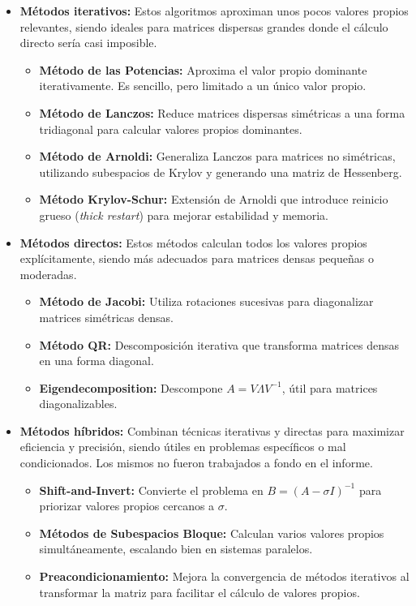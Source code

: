 \documentclass{article}
\begin{document}
\begin{itemize}
    \item \textbf{Métodos iterativos:}
    Estos algoritmos aproximan unos pocos valores propios relevantes, siendo ideales para matrices dispersas grandes donde el cálculo directo sería casi imposible.
    \begin{itemize}
        \item \textbf{Método de las Potencias:} Aproxima el valor propio dominante iterativamente. Es sencillo, pero limitado a un único valor propio.
        \item \textbf{Método de Lanczos:} Reduce matrices dispersas simétricas a una forma tridiagonal para calcular valores propios dominantes.
        \item \textbf{Método de Arnoldi:} Generaliza Lanczos para matrices no simétricas, utilizando subespacios de Krylov y generando una matriz de Hessenberg.
        \item \textbf{Método Krylov-Schur:} Extensión de Arnoldi que introduce reinicio grueso (\textit{thick restart}) para mejorar estabilidad y memoria.
    \end{itemize}

    \item \textbf{Métodos directos:}
    Estos métodos calculan todos los valores propios explícitamente, siendo más adecuados para matrices densas pequeñas o moderadas.
    \begin{itemize}
        \item \textbf{Método de Jacobi:} Utiliza rotaciones sucesivas para diagonalizar matrices simétricas densas.
        \item \textbf{Método QR:} Descomposición iterativa que transforma matrices densas en una forma diagonal.
        \item \textbf{Eigendecomposition:} Descompone \(A = V \Lambda V^{-1}\), útil para matrices diagonalizables.
    \end{itemize}

    \item \textbf{Métodos híbridos:}
    Combinan técnicas iterativas y directas para maximizar eficiencia y precisión, siendo útiles en problemas específicos o mal condicionados. Los mismos no fueron trabajados a fondo en el informe.
    \begin{itemize}
        \item \textbf{Shift-and-Invert:} Convierte el problema en \(B = (A - \sigma I)^{-1}\) para priorizar valores propios cercanos a \(\sigma\).
        \item \textbf{Métodos de Subespacios Bloque:} Calculan varios valores propios simultáneamente, escalando bien en sistemas paralelos.
        \item \textbf{Preacondicionamiento:} Mejora la convergencia de métodos iterativos al transformar la matriz para facilitar el cálculo de valores propios.
    \end{itemize}
\end{itemize}
\end{document}
